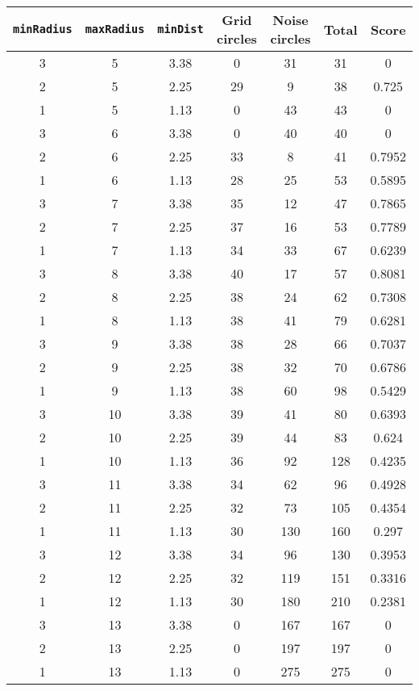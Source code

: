 \documentclass[letterpaper, 12pt]{article}
\begin{document}
\begin{longtable}{|c|c|c|c|c|c|c|}
\hline
\textbf{\texttt{minRadius}} & \textbf{\texttt{maxRadius}} & \textbf{\texttt{minDist}} & \textbf{Grid circles} & \textbf{Noise circles} & \textbf{Total} & \textbf{Score} \\
\hline
3 & 5 & 3.38 & 0 & 31 & 31 & 0 \\
\hline
2 & 5 & 2.25 & 29 & 9 & 38 & 0.725 \\
\hline
1 & 5 & 1.13 & 0 & 43 & 43 & 0 \\
\hline
3 & 6 & 3.38 & 0 & 40 & 40 & 0 \\
\hline
2 & 6 & 2.25 & 33 & 8 & 41 & 0.7952 \\
\hline
1 & 6 & 1.13 & 28 & 25 & 53 & 0.5895 \\
\hline
3 & 7 & 3.38 & 35 & 12 & 47 & 0.7865 \\
\hline
2 & 7 & 2.25 & 37 & 16 & 53 & 0.7789 \\
\hline
1 & 7 & 1.13 & 34 & 33 & 67 & 0.6239 \\
\hline
3 & 8 & 3.38 & 40 & 17 & 57 & 0.8081 \\
\hline
2 & 8 & 2.25 & 38 & 24 & 62 & 0.7308 \\
\hline
1 & 8 & 1.13 & 38 & 41 & 79 & 0.6281 \\
\hline
3 & 9 & 3.38 & 38 & 28 & 66 & 0.7037 \\
\hline
2 & 9 & 2.25 & 38 & 32 & 70 & 0.6786 \\
\hline
1 & 9 & 1.13 & 38 & 60 & 98 & 0.5429 \\
\hline
3 & 10 & 3.38 & 39 & 41 & 80 & 0.6393 \\
\hline
2 & 10 & 2.25 & 39 & 44 & 83 & 0.624 \\
\hline
1 & 10 & 1.13 & 36 & 92 & 128 & 0.4235 \\
\hline
3 & 11 & 3.38 & 34 & 62 & 96 & 0.4928 \\
\hline
2 & 11 & 2.25 & 32 & 73 & 105 & 0.4354 \\
\hline
1 & 11 & 1.13 & 30 & 130 & 160 & 0.297 \\
\hline
3 & 12 & 3.38 & 34 & 96 & 130 & 0.3953 \\
\hline
2 & 12 & 2.25 & 32 & 119 & 151 & 0.3316 \\
\hline
1 & 12 & 1.13 & 30 & 180 & 210 & 0.2381 \\
\hline
3 & 13 & 3.38 & 0 & 167 & 167 & 0 \\
\hline
2 & 13 & 2.25 & 0 & 197 & 197 & 0 \\
\hline
1 & 13 & 1.13 & 0 & 275 & 275 & 0 \\

\end{longtable}
\end{document}

